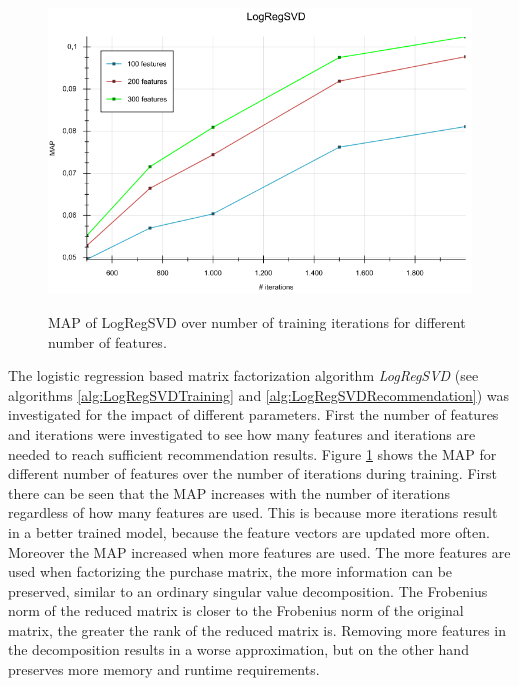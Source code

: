 \documentclass[10pt]{reportMaster}
\begin{document}
\begin{figure}
	\caption{MAP of LogRegSVD over number of training iterations for different number of features.}
	\centering
	\includegraphics[width=1\textwidth]{figures/experiments/LogRegSVDIterations}
	\label{fig:LogRegSVDIterations}
\end{figure}

The logistic regression based matrix factorization algorithm \textit{LogRegSVD} (see algorithms \ref{alg:LogRegSVDTraining} and \ref{alg:LogRegSVDRecommendation}) was investigated for the impact of different parameters.
First the number of features and iterations were investigated to see how many features and iterations are needed to reach sufficient recommendation results.
Figure \ref{fig:LogRegSVDIterations} shows the MAP for different number of features over the number of iterations during training.
First there can be seen that the MAP increases with the number of iterations regardless of how many features are used.
This is because more iterations result in a better trained model, because the feature vectors are updated more often.
Moreover the MAP increased when more features are used.
The more features are used when factorizing the purchase matrix, the more information can be preserved, similar to an ordinary singular value decomposition.
The Frobenius norm of the reduced matrix is closer to the Frobenius norm of the original matrix, the greater the rank of the reduced matrix is.
Removing more features in the decomposition results in a worse approximation, but on the other hand preserves more memory and runtime requirements.
\end{document}
